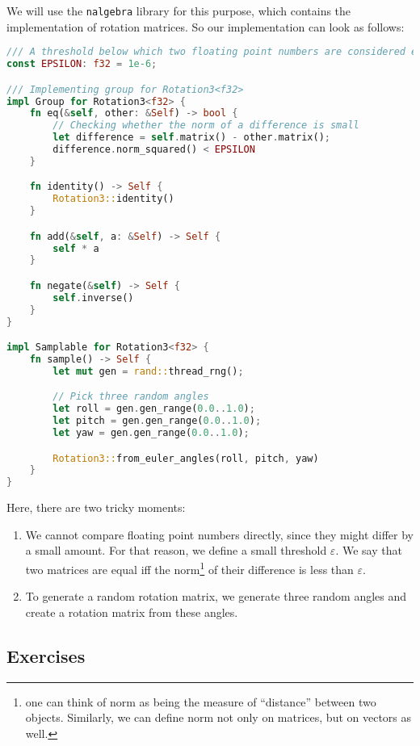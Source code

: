 \documentclass[../lecture-notes-148x210.tex]{subfiles}
\begin{document}
We will use the \texttt{nalgebra} library for this purpose, which contains the implementation of rotation matrices. 
So our implementation can look as follows:
\begin{lstlisting}[language=Rust]
/// A threshold below which two floating point numbers are considered equal.
const EPSILON: f32 = 1e-6;

/// Implementing group for Rotation3<f32>
impl Group for Rotation3<f32> {
    fn eq(&self, other: &Self) -> bool {
        // Checking whether the norm of a difference is small
        let difference = self.matrix() - other.matrix();
        difference.norm_squared() < EPSILON
    }

    fn identity() -> Self {
        Rotation3::identity()
    }

    fn add(&self, a: &Self) -> Self {
        self * a
    }

    fn negate(&self) -> Self {
        self.inverse()
    }
}

impl Samplable for Rotation3<f32> {
    fn sample() -> Self {
        let mut gen = rand::thread_rng();

        // Pick three random angles
        let roll = gen.gen_range(0.0..1.0);
        let pitch = gen.gen_range(0.0..1.0);
        let yaw = gen.gen_range(0.0..1.0);

        Rotation3::from_euler_angles(roll, pitch, yaw)
    }
}
\end{lstlisting}

Here, there are two tricky moments:
\begin{enumerate}
    \item We cannot compare floating point numbers directly, since they might differ by a small amount. For that reason, we define a small threshold $\varepsilon$. We say that two matrices are equal iff the norm\footnote{one can think of norm as being the measure of ``distance'' between two objects. Similarly, we can define norm not only on matrices, but on vectors as well.} of their difference is less than $\varepsilon$.
    \item To generate a random rotation matrix, we generate three random angles and create a rotation matrix from these angles.
\end{enumerate}

\newpage

\subsection{Exercises}
\end{document}
